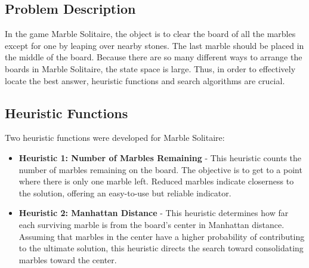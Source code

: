 \documentclass[conference]{IEEEtran}
\begin{document}
\subsection{Problem Description}
In the game Marble Solitaire, the object is to clear the board of all the marbles except for one by leaping over nearby stones. The last marble should be placed in the middle of the board. Because there are so many different ways to arrange the boards in Marble Solitaire, the state space is large. Thus, in order to effectively locate the best answer, heuristic functions and search algorithms are crucial.

\subsection{Heuristic Functions}
Two heuristic functions were developed for Marble Solitaire:
\begin{itemize}
    \item \textbf{Heuristic 1: Number of Marbles Remaining} - This heuristic counts the number of marbles remaining on the board. The objective is to get to a point where there is only one marble left. Reduced marbles indicate closerness to the solution, offering an easy-to-use but reliable indicator.
    \item \textbf{Heuristic 2: Manhattan Distance} - This heuristic determines how far each surviving marble is from the board's center in Manhattan distance. Assuming that marbles in the center have a higher probability of contributing to the ultimate solution, this heuristic directs the search toward consolidating marbles toward the center.
\end{itemize}
\end{document}
